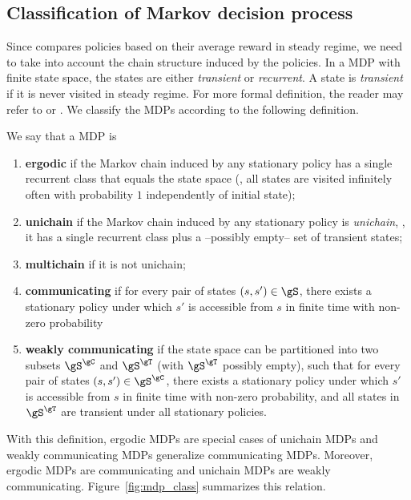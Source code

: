 \subsection{Classification of Markov decision process}
Since  compares policies based on their average reward in steady regime, we need to take into account the chain structure induced by the policies.
In a MDP with finite state space, the states are either \emph{transient} or \emph{recurrent}.
A state is \emph{transient} if it is never visited in steady regime.
For more formal definition, the reader may refer to \cite[Appendix~A]{puterman2014markov} or \cite{levin2017markov}.
We classify the MDPs according to the following definition.
\begin{defn}
    \label{ch:mdp:defn:mdp_class}
    We say that a MDP is
    \begin{enumerate}[label=(\roman*)]
        \item \textbf{ergodic} if the Markov chain induced by any stationary policy has a single recurrent class that equals the state space (\ie, all states are visited infinitely often with probability $1$ independently of initial state);
        \item \label{it:unichain} \textbf{unichain} if the Markov chain induced by any stationary policy is \emph{unichain}, \ie, it has a single recurrent class plus a --possibly empty-- set of transient states;
        \item \textbf{multichain} if it is not unichain;
        \item \textbf{communicating} if for every pair of states $(s,s')\in\gS$, there exists a stationary policy under which $s'$ is accessible from $s$ in finite time with non-zero probability
        \item \textbf{weakly communicating} if the state space can be partitioned into two subsets $\gS^{\gC}$ and $\gS^{\gT}$ (with $\gS^{\gT}$ possibly empty), such that for every pair of states $(s,s')\in\gS^{\gC}$, there exists a stationary policy under which $s'$ is accessible from $s$ in finite time with non-zero probability, and all states in $\gS^{\gT}$ are transient under all stationary policies.
    \end{enumerate}
\end{defn}
With this definition, ergodic MDPs are special cases of unichain MDPs and weakly communicating MDPs generalize communicating MDPs. 
Moreover, ergodic MDPs are communicating and unichain MDPs are weakly communicating.
Figure~\ref{fig:mdp_class} summarizes this relation.

